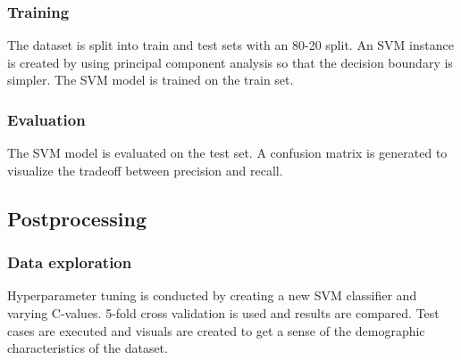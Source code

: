 \documentclass[10pt,twocolumn]{article}
\begin{document}
\subsubsection{Training}
The dataset is split into train and test sets with an 80-20 split. An SVM instance is created by using principal component analysis so that the decision boundary is simpler. The SVM model is trained on the train set.

\subsubsection{Evaluation}
The SVM model is evaluated on the test set. A confusion matrix is generated to visualize the tradeoff between precision and recall.

\subsection{Postprocessing}

\subsubsection{Data exploration}
Hyperparameter tuning is conducted by creating a new SVM classifier and varying C-values. 5-fold cross validation is used and results are compared. Test cases are executed and visuals are created to get a sense of the demographic characteristics of the dataset.

\printbibliography
\end{document}
